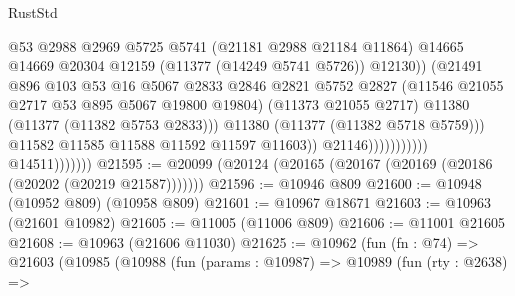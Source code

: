 \begin{lexlean}{RustStd}
\begin{coremodule}
                                                  @53
                                                  @2988
                                                  @2969
                                                  @5725
                                                  @5741
                                                  (@21181 @2988 @21184 @11864)
                                                  @14665
                                                  @14669
                                                  @20304
                                                  @12159
                                                  (@11377 (@14249 @5741 @5726))
                                                  @12130))
                                              (@21491
                                                @896
                                                @103
                                                @53
                                                @16
                                                @5067
                                                @2833
                                                @2846
                                                @2821
                                                @5752
                                                @2827
                                                (@11546 @21055 @2717 @53 @895 @5067 @19800 @19804)
                                                (@11373 @21055 @2717)
                                                @11380
                                                (@11377 (@11382 @5753 @2833)))
                                              @11380
                                              (@11377 (@11382 @5718 @5759)))
                                            @11582
                                            @11585
                                            @11588
                                            @11592
                                            @11597
                                            @11603))
                                        @21146)))))))))))
                  @14511)))))))
@21595 := @20099 (@20124 (@20165 (@20167 (@20169 (@20186 (@20202 (@20219 @21587)))))))
@21596 := @10946 @809
@21600 := @10948 (@10952 @809) (@10958 @809)
@21601 := @10967 @18671
@21603 := @10963 (@21601 @10982)
@21605 := @11005 (@11006 @809)
@21606 := @11001 @21605
@21608 := @10963 (@21606 @11030)
@21625 := @10962
    (fun (fn : @74) =>
    @21603
      (@10985
        (@10988
          (fun (params : @10987) =>
          @10989
            (fun (rty : @2638) =>

\end{coremodule}
\end{lexlean}
